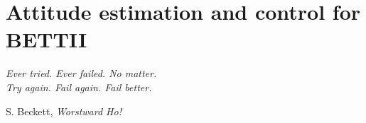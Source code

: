 
\chapter[Attitude estimation and control for BETTII]{Attitude estimation and control for BETTII} %

\label{chap:controls} %

\epigraph{\small\itshape Ever tried. Ever failed. No matter. \\ Try again. Fail again. Fail better.}{S. Beckett, \textit{Worstward Ho!}}


\usetikzlibrary{decorations.markings}

\renewcommand*{\arraystretch}{0.75}

%





%






